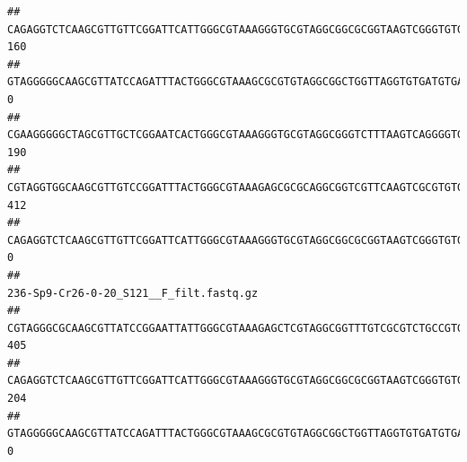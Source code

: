 \documentclass[]{article}
\begin{document}
\begin{verbatim}
## CAGAGGTCTCAAGCGTTGTTCGGATTCATTGGGCGTAAAGGGTGCGTAGGCGGCGCGGTAAGTCGGGTGTGAAATCTCGGAGCTTAACTCCGAAACTGCATTCGATACTGCCGTGCTTGAGGACTGGAGAGGAGACTGGAATTTACGGTGTAGCGGTGAAATGCGTAGATATCGTAAGGAAGACCAGTGGCGAAGGCGGGTCTCTGGACAGTTCCTGACGCTGAGGCACGAAGGCCAGGGGAGCAAACG                                     160
## GTAGGGGGCAAGCGTTATCCAGATTTACTGGGCGTAAAGCGCGTGTAGGCGGCTGGTTAGGTGTGATGTGAAATCTTCCGGCTCAACCGGAAAACTGCATTGCAAACCGGCCTGGCTAGAGTGCAGGAGAGGGAAGCGGAATTCCAGGTGTAGCGGTGAAATGCGTAGATATCTGGAGGAACACCAGTGGCGAAGGCGGCTTCCTGGCCTGCAACTGACGCTGAGACGCGAAAGCGTGGGGAGCGAAC                                        0
## CGAAGGGGGCTAGCGTTGCTCGGAATCACTGGGCGTAAAGGGTGCGTAGGCGGGTCTTTAAGTCAGGGGTGAAATCCTGGAGCTCAACTCCAGAACTGCCTTTGATACTGAAGATCTTGAGTTCGGGAGAGGTGAGTGGAACTGCGAGTGTAGAGGTGAAATTCGTAGATATTCGCAAGAACACCAGTGGCGAAGGCGGCTCACTGGCCCGATACTGACGCTGAGGCACGAAAGCGTGGGGAGCAAACA                                     190
## CGTAGGTGGCAAGCGTTGTCCGGATTTACTGGGCGTAAAGAGCGCGCAGGCGGTCGTTCAAGTCGCGTGTGAAAGCCCCCGGCTCAACTGGGGAGGGTCACGCGATACTGATCGACTCGAAGGCAGGAGAGGGTAGTGGAATTCCCGGTGTAGTGGTGAAATGCGTAGATATCGGGAGGAACACCAGTGGCGAAGGCGACTACCTGGCCTGTTCTTGACGCTGAGGCGCGAAAGCTAGGGGAGCAAACG                                     412
## CAGAGGTCTCAAGCGTTGTTCGGATTCATTGGGCGTAAAGGGTGCGTAGGCGGCGCGGTAAGTCGGGTGTGAAATCTCGGGGCTTAACTCCGAAACTGCATTCGATACTGCCGTGCTTGAGGACTGGAGAGGAGACTGGAATTTACGGTGTAGCGGTGAAATGCGTAGATATCGTAAGGAAGACCAGTGGCGAAGGCGGGTCTCTGGACAGTTCCTGACGCTGAGGCACGAAGGCCAGGGGAGCAAACG                                       0
##                                                                                                                                                                                                                                                           236-Sp9-Cr26-0-20_S121__F_filt.fastq.gz
## CGTAGGGCGCAAGCGTTATCCGGAATTATTGGGCGTAAAGAGCTCGTAGGCGGTTTGTCGCGTCTGCCGTGAAAGTCCGGGGCTCAACTCCGGATCTGCGGTGGGTACGGGCAGACTAGAGTGATGTAGGGGAGACTGGAATTCCTGGTGTAGCGGTGAAATGCGCAGATATCAGGAGGAACACCGATGGCGAAGGCAGGTCTCTGGGCATTAACTGACGCTGAGGAGCGAAAGCATGGGGAGCGAACA                                     405
## CAGAGGTCTCAAGCGTTGTTCGGATTCATTGGGCGTAAAGGGTGCGTAGGCGGCGCGGTAAGTCGGGTGTGAAATCTCGGAGCTTAACTCCGAAACTGCATTCGATACTGCCGTGCTTGAGGACTGGAGAGGAGACTGGAATTTACGGTGTAGCGGTGAAATGCGTAGATATCGTAAGGAAGACCAGTGGCGAAGGCGGGTCTCTGGACAGTTCCTGACGCTGAGGCACGAAGGCCAGGGGAGCAAACG                                     204
## GTAGGGGGCAAGCGTTATCCAGATTTACTGGGCGTAAAGCGCGTGTAGGCGGCTGGTTAGGTGTGATGTGAAATCTTCCGGCTCAACCGGAAAACTGCATTGCAAACCGGCCTGGCTAGAGTGCAGGAGAGGGAAGCGGAATTCCAGGTGTAGCGGTGAAATGCGTAGATATCTGGAGGAACACCAGTGGCGAAGGCGGCTTCCTGGCCTGCAACTGACGCTGAGACGCGAAAGCGTGGGGAGCGAAC                                        0

\end{verbatim}
\end{document}
